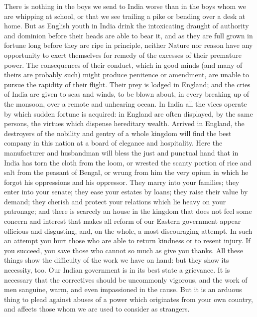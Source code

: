 There is nothing in the boys we send to India worse than in the boys whom we are whipping at school, or that we see trailing a pike or bending over a desk at home. But as English youth in India drink the intoxicating draught of authority and dominion before their heads are able to bear it, and as they are full grown in fortune long before they are ripe in principle, neither Nature nor reason have any opportunity to exert themselves for remedy of the excesses of their premature power. The consequences of their conduct, which in good minds (and many of theirs are probably such) might produce penitence or amendment, are unable to pursue the rapidity of their flight. Their prey is lodged in England; and the cries of India are given to seas and winds, to be blown about, in every breaking up of the monsoon, over a remote and unhearing ocean. In India all the vices operate by which sudden fortune is acquired: in England are often displayed, by the same persons, the virtues which dispense hereditary wealth. Arrived in England, the destroyers of the nobility and gentry of a whole kingdom will find the best company in this nation at a board of elegance and hospitality. Here the manufacturer and husbandman will bless the just and punctual hand that in India has torn the cloth from the loom, or wrested the scanty portion of rice and salt from the peasant of Bengal, or wrung from him the very opium in which he forgot his oppressions and his oppressor. They marry into your families; they enter into your senate; they ease your estates by loans; they raise their value by demand; they cherish and protect your relations which lie heavy on your patronage; and there is scarcely an house in the kingdom that does not feel some concern and interest that makes all reform of our Eastern government appear officious and disgusting, and, on the whole, a most discouraging attempt. In such an attempt you hurt those who are able to return kindness or to resent injury. If you succeed, you save those who cannot so much as give you thanks. All these things show the difficulty of the work we have on hand: but they show its necessity, too. Our Indian government is in its best state a grievance. It is necessary that the correctives should be uncommonly vigorous, and the work of men sanguine, warm, and even impassioned in the cause. But it is an arduous thing to plead against abuses of a power which originates from your own country, and affects those whom we are used to consider as strangers.

